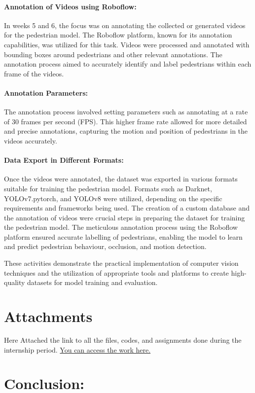 \documentclass{article}
\begin{document}
\paragraph{Annotation of Videos using Roboflow:}
In weeks 5 and 6, the focus was on annotating the collected or generated videos for the pedestrian model. The Roboflow platform, known for its annotation capabilities, was utilized for this task. Videos were processed and annotated with bounding boxes around pedestrians and other relevant annotations. The annotation process aimed to accurately identify and label pedestrians within each frame of the videos.
\paragraph{Annotation Parameters:}
The annotation process involved setting parameters such as annotating at a rate of 30 frames per second (FPS).
This higher frame rate allowed for more detailed and precise annotations, capturing the motion and position of pedestrians in the videos accurately.
\paragraph{Data Export in Different Formats:}
Once the videos were annotated, the dataset was exported in various formats suitable for training the pedestrian model.
Formats such as Darknet, YOLOv7.pytorch, and YOLOv8 were utilized, depending on the specific requirements and frameworks being used.
The creation of a custom database and the annotation of videos were crucial steps in preparing the dataset for training the pedestrian model. The meticulous annotation process using the Roboflow platform ensured accurate labelling of pedestrians, enabling the model to learn and predict pedestrian behaviour, occlusion, and motion detection.

These activities demonstrate the practical implementation of computer vision techniques and the utilization of appropriate tools and platforms to create high-quality datasets for model training and evaluation.

\section{Attachments}
Here Attached the link to all the files, codes, and assignments done during the internship period.
\href{https://drive.google.com/drive/folders/1oZdLJxZ_qfOdF_AmORsNbd4Sn4f3LThi?usp=sharing}{You can access the work here.}
\section{Conclusion:}
\end{document}
